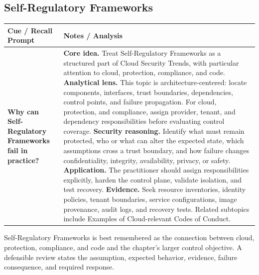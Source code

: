 \documentclass[11pt]{article}
\newcommand{\CornellHeader}{%
\rowcolor{Navy}\color{white}\bfseries Cue / Recall Prompt & \color{white}\bfseries Notes / Analysis\\\hline}
\newcommand{\CornellRow}[2]{%
\cellcolor{CueGray}\RaggedRight\textbf{#1} & \RaggedRight #2\\\hline}
\begin{document}
\subsection*{Self-Regulatory Frameworks}
\begin{longtable}{>{\RaggedRight\arraybackslash}p{}|>{\RaggedRight\arraybackslash}p{}}
\CornellHeader
\CornellRow{Why can Self-Regulatory Frameworks fail in practice?}{\textbf{Core idea.} Treat Self-Regulatory Frameworks as a structured part of Cloud Security Trends, with particular attention to cloud, protection, compliance, and code. \textbf{Analytical lens.} This topic is architecture-centered: locate components, interfaces, trust boundaries, dependencies, control points, and failure propagation. For cloud, protection, and compliance, assign provider, tenant, and dependency responsibilities before evaluating control coverage. \textbf{Security reasoning.} Identify what must remain protected, who or what can alter the expected state, which assumptions cross a trust boundary, and how failure changes confidentiality, integrity, availability, privacy, or safety. \textbf{Application.} The practitioner should assign responsibilities explicitly, harden the control plane, validate isolation, and test recovery. \textbf{Evidence.} Seek resource inventories, identity policies, tenant boundaries, service configurations, image provenance, audit logs, and recovery tests. Related subtopics include Examples of Cloud-relevant Codes of Conduct.}
\end{longtable}
\begin{topicsummary}
Self-Regulatory Frameworks is best remembered as the connection between cloud, protection, compliance, and code and the chapter's larger control objective. A defensible review states the assumption, expected behavior, evidence, failure consequence, and required response.
\end{topicsummary}
\end{document}
